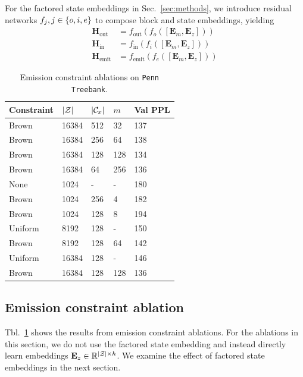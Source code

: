 \documentclass[11pt,a4paper]{article}
\begin{document}
For the factored state embeddings in Sec.~\ref{sec:methods}, we
introduce residual networks $f_j,j\in\left\{o,i,e\right\}$
to compose block and state embeddings, yielding
\begin{equation}
\begin{aligned}
\mathbf{H}_\textrm{out} &= f_\textrm{out}(f_o([\mathbf{E}_m,\mathbf{E}_z]))\\
\mathbf{H}_\textrm{in} &= f_\textrm{in}(f_i([\mathbf{E}_m,\mathbf{E}_z]))\\
\mathbf{H}_\textrm{emit} &= f_\textrm{emit}(f_e([\mathbf{E}_m,\mathbf{E}_z]))
\end{aligned}
\end{equation}

\begin{table}[t]
\centering
\begin{tabular}{lllll}
\toprule
Constraint & $|\mathcal{Z}|$ & $|\mathcal{C}_x|$ & $m$ & Val PPL\\
\midrule
Brown & 16384 & 512 & 32  & 137\\
Brown & 16384 & 256 & 64  & 138\\
Brown & 16384 & 128 & 128 & 134\\
Brown & 16384 & 64  & 256 & 136\\
\midrule
None  & 1024 & - & - & 180\\
Brown & 1024 & 256 & 4 & 182\\
Brown & 1024 & 128 & 8 & 194\\
\midrule
Uniform    & 8192    & 128    & -   & 150\\
Brown      & 8192    & 128    & 64  & 142\\
Uniform    & 16384   & 128    & -   & 146\\
Brown      & 16384   & 128    & 128 & 136\\
\bottomrule
\end{tabular}
\caption{\label{tbl:constraint-ablation}
Emission constraint ablations on \texttt{Penn Treebank}.
}
\end{table}


\subsection{Emission constraint ablation}
Tbl.~\ref{tbl:constraint-ablation} shows the results from 
emission constraint ablations.
For the ablations in this section,
we do not use the factored state embedding
and instead directly learn embeddings $\mathbf{E}_z\in\mathbb{R}^{|\mathcal{Z}|\times h}$.
We examine the effect of factored state embeddings in the next section.
\end{document}
